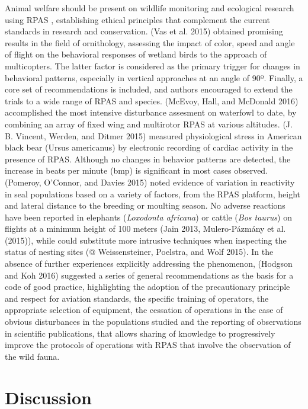 \documentclass[]{interact}
\theoremstyle{plain}%
\theoremstyle{definition}
\theoremstyle{remark}
\begin{document}
Animal welfare should be present on wildlife monitoring and ecological
research using RPAS , establishing ethical principles that complement
the current standards in research and conservation. (Vas et al. 2015)
obtained promising results in the field of ornithology, assessing the
impact of color, speed and angle of flight on the behavioral responses
of wetland birds to the approach of multicopters. The latter factor is
considered as the primary trigger for changes in behavioral patterns,
especially in vertical approaches at an angle of 90º. Finally, a core
set of recommendations is included, and authors encouraged to extend the
trials to a wide range of RPAS and species. (McEvoy, Hall, and McDonald
2016) accomplished the most intensive disturbance assesment on waterfowl
to date, by combining an array of fixed wing and multirotor RPAS at
various altitudes. (J. B. Vincent, Werden, and Ditmer 2015) measured
physiological stress in American black bear (Ursus americanus) by
electronic recording of cardiac activity in the presence of RPAS.
Although no changes in behavior patterns are detected, the increase in
beats per minute (bmp) is significant in most cases observed. (Pomeroy,
O'Connor, and Davies 2015) noted evidence of variation in reactivity in
seal populations based on a variety of factors, from the RPAS platform,
height and lateral distance to the breeding or moulting season. No
adverse reactions have been reported in elephants (\emph{Loxodonta
africana}) or cattle (\emph{Bos taurus}) on flights at a minimum height
of 100 meters (Jain 2013, Mulero-Pázmány et al. (2015)), while could
substitute more intrusive techniques when inspecting the status of
nesting sites (@ Weissensteiner, Poelstra, and Wolf 2015). In the
absence of further experiences explicitly addressing the phenomenon,
(Hodgson and Koh 2016) suggested a series of general recommendations as
the basis for a code of good practice, highlighting the adoption of the
precautionary principle and respect for aviation standards, the specific
training of operators, the appropriate selection of equipment, the
cessation of operations in the case of obvious disturbances in the
populations studied and the reporting of observations in scientific
publications, that allows sharing of knowledge to progressively improve
the protocols of operations with RPAS that involve the observation of
the wild fauna.

\section{Discussion}\label{discussion}
\end{document}
